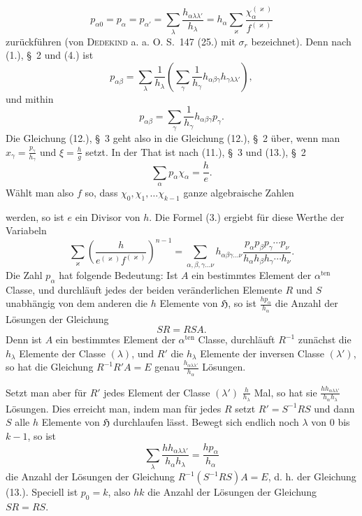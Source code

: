 \documentclass[11pt]{article}
\newcommand{\grp}{\mathfrak{H}}
\begin{document}
\begin{equation*}\tag{9.}
p_{\alpha0}=p_\alpha=p_{\alpha'}=\sum_\lambda\frac{h_{\alpha\lambda\lambda'}}{h_\lambda}=h_\alpha\sum_\varkappa\frac{\chi_\alpha^{(\varkappa)}}{f^{(\varkappa)}}
\end{equation*}
zurückführen (von \textsc{Dedekind} a. a. O. S.~147 (25.) mit $\sigma_r$ bezeichnet). Denn nach (1.), \S~2 und (4.) ist
\[
p_{\alpha\beta}=\sum_\lambda\frac{1}{h_\lambda}\left(\sum_\gamma\frac{1}{h_\gamma}h_{\alpha\beta\gamma}h_{\gamma\lambda\lambda'}\right),
\]
und mithin
\begin{equation*}\tag{10.}
p_{\alpha\beta}=\sum_\gamma\frac{1}{h_\gamma}h_{\alpha\beta\gamma}p_\gamma.
\end{equation*}
Die Gleichung (12.), \S~3 geht also in die Gleichung (12.), \S~2 über, wenn man $x_\gamma=\frac{p_\gamma}{h_\gamma}$ und $\xi=\frac{h}{g}$ setzt. In der That ist nach (11.), \S~3 und (13.), \S~2
\begin{equation*}\tag{11.}
\sum_\alpha p_\alpha\chi_\alpha=\frac{h}{e}.
\end{equation*}
Wählt man also $f$ so, dass $\chi_0,\chi_1,\ldots\chi_{k-1}$ ganze algebraische Zahlen


werden, so ist $e$ ein Divisor von $h$. Die Formel (3.) ergiebt für diese Werthe der Variabeln
\begin{equation*}\tag{12.}
\sum_\varkappa\left(\frac{h}{e^{(\varkappa)}f^{(\varkappa)}}\right)^{n-1}
=\sum_{\alpha,\beta,\gamma\ldots\nu}h_{\alpha\beta\gamma\ldots\nu}\frac{p_\alpha p_\beta p_\gamma\cdots p_\nu}{h_\alpha h_\beta h_\gamma\cdots h_\nu}.
\end{equation*}
Die Zahl $p_\alpha$ hat folgende Bedeutung: Ist $A$ ein bestimmtes Element der $\alpha^{\text{ten}}$ Classe, und durchläuft jedes der beiden veränderlichen Elemente $R$ und $S$ unabhängig von dem anderen die $h$ Elemente von $\grp$, so ist $\frac{hp_\alpha}{h_\alpha}$ die Anzahl der Lösungen der Gleichung
\begin{equation*}\tag{13.}
SR=RSA.
\end{equation*}
Denn ist $A$ ein bestimmtes Element der $\alpha^{\text{ten}}$ Classe, durchläuft $R^{-1}$ zunächst die $h_\lambda$ Elemente der Classe $(\lambda)$, und $R'$ die $h_\lambda$ Elemente der inversen Classe $(\lambda')$, so hat die Gleichung $R^{-1}R'A=E$ genau $\frac{h_{\alpha\lambda\lambda'}}{h_\alpha}$ Lösungen.

Setzt man aber für $R'$ jedes Element der Classe $(\lambda')$ $\frac{h}{h_\lambda}$ Mal, so hat sie $\frac{h h_{\alpha\lambda\lambda'}}{h_\alpha h_\lambda}$ Lösungen. Dies erreicht man, indem man für jedes $R$ setzt $R'=S^{-1}RS$ und dann $S$ alle $h$ Elemente von $\grp$ durchlaufen lässt. Bewegt sich endlich noch $\lambda$ von $0$ bis $k-1$, so ist
\[
\sum_\lambda\frac{h h_{\alpha\lambda\lambda'}}{h_\alpha h_\lambda}=\frac{hp_\alpha}{h_\alpha}
\]
die Anzahl der Lösungen der Gleichung $R^{-1}(S^{-1}RS)A=E$, d. h. der Gleichung (13.). Speciell ist $p_0=k$, also $hk$ die Anzahl der Lösungen der Gleichung $SR=RS$.
\end{document}
